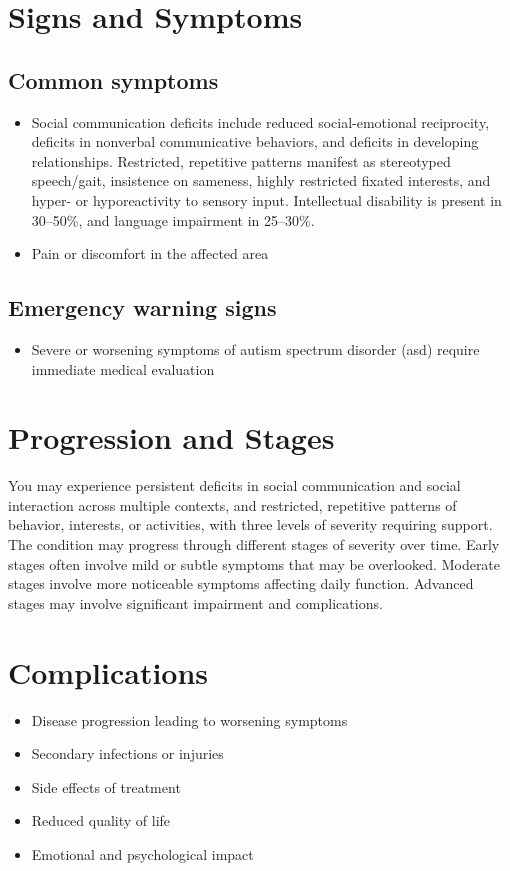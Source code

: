 \section{Signs and Symptoms}
\subsection{Common symptoms}
\begin{itemize}[noitemsep]
  \item Social communication deficits include reduced social-emotional reciprocity, deficits in nonverbal communicative behaviors, and deficits in developing relationships. Restricted, repetitive patterns manifest as stereotyped speech/gait, insistence on sameness, highly restricted fixated interests, and hyper- or hyporeactivity to sensory input. Intellectual disability is present in 30--50\%, and language impairment in 25--30\%.
  \item Pain or discomfort in the affected area
  \end{itemize}
\subsection{Emergency warning signs}
\begin{itemize}[noitemsep]
  \item Severe or worsening symptoms of autism spectrum disorder (asd) require immediate medical evaluation
\end{itemize}
\section{Progression and Stages}
You may experience persistent deficits in social communication and social interaction across multiple contexts, and restricted, repetitive patterns of behavior, interests, or activities, with three levels of severity requiring support. The condition may progress through different stages of severity over time. Early stages often involve mild or subtle symptoms that may be overlooked. Moderate stages involve more noticeable symptoms affecting daily function. Advanced stages may involve significant impairment and complications.
\section{Complications}
\begin{itemize}[noitemsep]
  \item Disease progression leading to worsening symptoms
  \item Secondary infections or injuries
  \item Side effects of treatment
  \item Reduced quality of life
  \item Emotional and psychological impact
\end{itemize}
